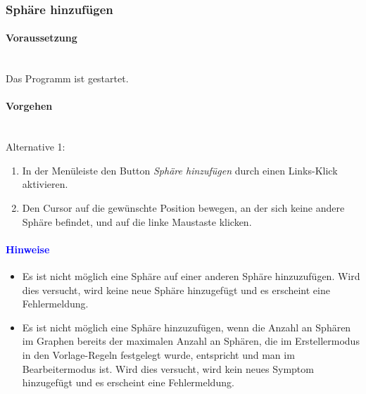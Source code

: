 \documentclass[enabledeprecatedfontcommands,fontsize=11pt,paper=a4,twoside]{scrartcl}
\newcommand*{\hint}{\paragraph{\textcolor{blue}{Hinweise}}}
\newcommand*{\condition}{\paragraph{Voraussetzung}$\;$ \vspace{0.2cm}\\}
\newcommand*{\actions}{\paragraph{Vorgehen} $\;$\vspace{0.2cm}\\}
\begin{document}
		\subsubsection{Sphäre hinzufügen}	
		\condition 	
		Das Programm ist gestartet.
		\actions
		Alternative 1: 
		\begin{enumerate}
			\item In der Menüleiste den Button \textit{Sphäre hinzufügen} durch einen Links-Klick aktivieren.
			\item Den Cursor auf die gewünschte Position bewegen, an der sich keine andere Sphäre befindet, und auf die linke Maustaste klicken.
		\end{enumerate}
		\hint
		\begin{itemize}
			\item Es ist nicht möglich eine Sphäre auf einer anderen Sphäre hinzuzufügen. Wird dies versucht, wird keine neue Sphäre hinzugefügt und es erscheint eine Fehlermeldung.
	\item Es ist nicht möglich eine Sphäre hinzuzufügen, wenn die Anzahl an Sphären im Graphen bereits der maximalen Anzahl an Sphären, die im Erstellermodus in den Vorlage-Regeln festgelegt wurde, entspricht und man im Bearbeitermodus ist. Wird dies versucht, wird kein neues Symptom hinzugefügt und es erscheint eine Fehlermeldung.
	\end{itemize}

\end{document}

